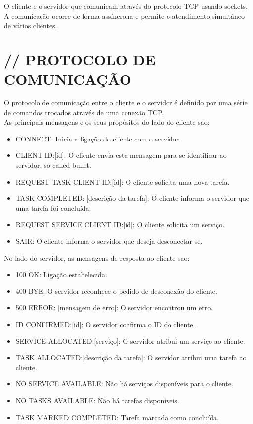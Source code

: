 \documentclass[12pt]{article}
\begin{document}
\noindent O cliente e o servidor que comunicam através do protocolo TCP usando sockets. A comunicação ocorre de forma assíncrona e permite o atendimento simultâneo de vários clientes.

\section{// PROTOCOLO DE COMUNICAÇÃO}
O protocolo de comunicação entre o cliente e o servidor é definido por uma série de comandos trocados através de uma conexão TCP.\\

\noindent As principais mensagens e os seus propósitos do lado do cliente sao:
\begin{itemize}
  \item CONNECT: Inicia a ligação do cliente com o servidor.
  \item CLIENT ID:[id]: O cliente envia esta mensagem para se identificar ao servidor. so-called bullet.
  \item REQUEST TASK CLIENT ID:[id]: O cliente solicita uma nova tarefa.
  \item TASK COMPLETED: [descrição da tarefa]: O cliente informa o servidor que uma tarefa foi concluída.
  \item REQUEST SERVICE CLIENT ID:[id]: O cliente solicita um serviço.
  \item SAIR: O cliente informa o servidor que deseja desconectar-se.
\end{itemize}

\noindent No lado do servidor, as mensagens de resposta ao cliente sao:  
\begin{itemize}
  \item 100 OK: Ligação estabelecida.
  \item 400 BYE: O servidor reconhece o pedido de desconexão do cliente.
  \item 500 ERROR: [mensagem de erro]: O servidor encontrou um erro.
  \item ID CONFIRMED:[id]: O servidor confirma o ID do cliente.
  \item SERVICE ALLOCATED:[serviço]: O servidor atribui um serviço ao cliente.
  \item TASK ALLOCATED:[descrição da tarefa]: O servidor atribui uma tarefa ao cliente.
  \item NO SERVICE AVAILABLE: Não há serviços disponíveis para o cliente.
  \item NO TASKS AVAILABLE: Não há tarefas disponíveis.
  \item TASK MARKED COMPLETED: Tarefa marcada como concluída.
\end{itemize}\newpage
\end{document}
